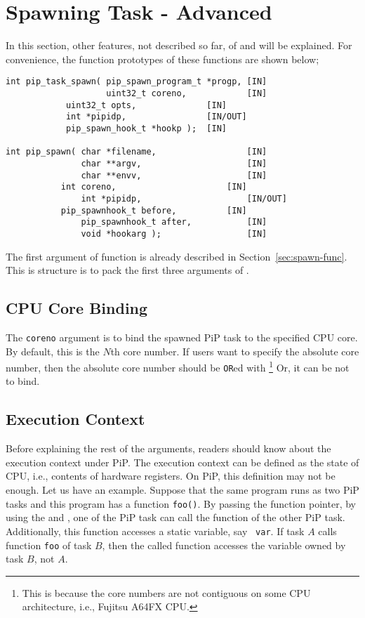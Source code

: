 
\section{Spawning Task - Advanced}\label{sec:spawn-adv}

In this section, other features, not described so far, of
 and  will be
explained. For convenience, the function prototypes of these functions
are shown below;

\begin{lstlisting}[frame=tb]
int pip_task_spawn( pip_spawn_program_t *progp, [IN]
                    uint32_t coreno,            [IN]
		    uint32_t opts,              [IN]
		    int *pipidp,                [IN/OUT]
		    pip_spawn_hook_t *hookp );  [IN]

int pip_spawn( char *filename,                  [IN]
               char **argv,                     [IN]
               char **envv,                     [IN]
	       int coreno,                      [IN]
               int *pipidp,                     [IN/OUT]
	       pip_spawnhook_t before,          [IN]
               pip_spawnhook_t after,           [IN]
               void *hookarg );                 [IN]
\end{lstlisting}

The first argument of  function is already
described in Section~\ref{sec:spawn-func}. This is structure is to
pack the first three arguments of . 

\subsection{CPU Core Binding}

The {\tt coreno} argument is to bind the spawned PiP task to the
specified CPU core. By default, this is the $N$th core number. If
users want to specify the absolute core number, then the absolute core
number should be {\tt OR}ed with
\footnote{This is because the core numbers
are not contiguous on some CPU architecture, i.e., Fujitsu A64FX CPU.}
Or, it can be  not to bind.

\subsection{Execution Context}

Before explaining the rest of the arguments, readers should know about
the execution context under PiP. The execution context can be defined
as the state of CPU, i.e., contents of hardware registers. On PiP,
this definition may not be enough. Let us have an example. Suppose
that the same program runs as two PiP tasks and this program has a
function {\tt foo()}. By passing the function pointer, by using the
 and , one of
the PiP task can call the function of the other PiP
task. Additionally, this function accesses a static variable, say {\tt
  var}. If task $A$ calls function {\tt foo} of task $B$, then the
called function accesses the variable owned by task $B$, not $A$.


